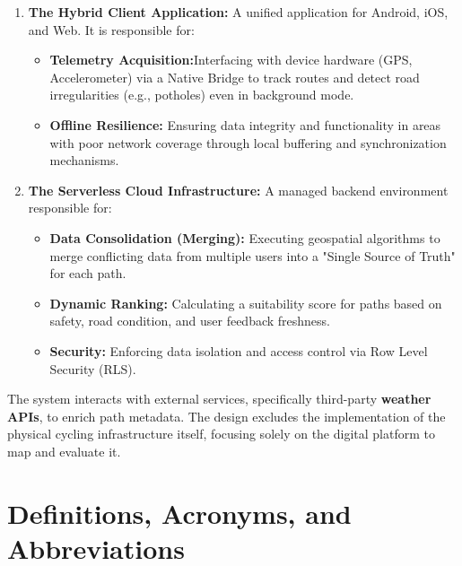 \begin{enumerate}
    \item \textbf{The Hybrid Client Application:}
    A unified application for Android, iOS, and Web. It is responsible for:
    \begin{itemize}
        \item \textbf{Telemetry Acquisition:}Interfacing with device hardware (GPS, Accelerometer) via a Native Bridge to track routes and detect road irregularities (e.g., potholes) even in background mode.
        \item \textbf{Offline Resilience:} Ensuring data integrity and functionality in areas with poor network coverage through local buffering and synchronization mechanisms.
    \end{itemize}

    \item \textbf{The Serverless Cloud Infrastructure:}
    A managed backend environment responsible for:
    \begin{itemize}
        \item \textbf{Data Consolidation (Merging):} Executing geospatial algorithms to merge conflicting data from multiple users into a "Single Source of Truth" for each path.
        \item \textbf{Dynamic Ranking:} Calculating a suitability score for paths based on safety, road condition, and user feedback freshness.
        \item \textbf{Security:} Enforcing data isolation and access control via Row Level Security (RLS).
    \end{itemize}
\end{enumerate}

The system interacts with external services, specifically third-party \textbf{weather APIs}, to enrich path metadata. The design excludes the implementation of the physical cycling infrastructure itself, focusing solely on the digital platform to map and evaluate it.

\section{Definitions, Acronyms, and Abbreviations}

